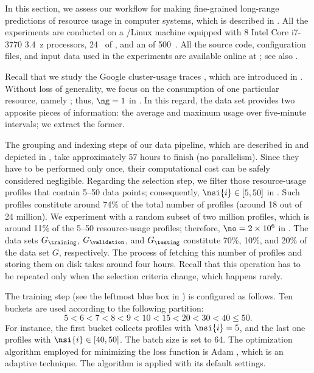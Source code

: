 In this section, we assess our workflow for making fine-grained long-range
predictions of resource usage in computer systems, which is described in
. All the experiments are conducted on a /Linux
machine equipped with 8 Intel Core i7-3770 3.4~z processors, 24~
of , and an  of 500~. All the source code, configuration
files, and input data used in the experiments are available online at
\cite{eslab2017b}; see also \cite{eslab2017c}.


Recall that we study the Google cluster-usage traces \cite{reiss2011}, which are
introduced in . Without loss of generality, we focus
on the consumption of one particular resource, namely ; thus, $\ng = 1$
in . In this regard, the data set provides two apposite
pieces of information: the average and maximum  usage over five-minute
intervals; we extract the former.

The grouping and indexing steps of our data pipeline, which are described in
 and depicted in , take
approximately 57 hours to finish (no parallelism). Since they have to be
performed only once, their computational cost can be safely considered
negligible. Regarding the selection step, we filter those resource-usage
profiles that contain 5--50 data points; consequently, $\nsi{i} \in [5, 50]$ in
. Such profiles constitute around 74\% of the total number
of profiles (around 18 out of 24 million). We experiment with a random subset of
two million profiles, which is around 11\% of the 5--50 resource-usage profiles;
therefore, $\no = 2 \times 10^6$ in . The data sets
$G_\training$, $G_\validation$, and $G_\testing$ constitute 70\%, 10\%, and 20\%
of the data set $G$, respectively. The process of fetching this number of
profiles and storing them on disk takes around four hours. Recall that this
operation has to be repeated only when the selection criteria change, which
happens rarely.


The training step (see the leftmost blue box in ) is
configured as follows. Ten buckets are used according to the following
partition:
\[
  5 < 6 < 7 < 8 < 9 < 10 < 15 < 20 < 30 < 40 \leq 50.
\]
For instance, the first bucket collects profiles with $\nsi{i} = 5$, and the
last one profiles with $\nsi{i} \in [40, 50]$. The batch size \nb is set to 64.
The optimization algorithm employed for minimizing the loss function is Adam
\cite{kingma2014}, which is an adaptive technique. The algorithm is applied with
its default settings.

